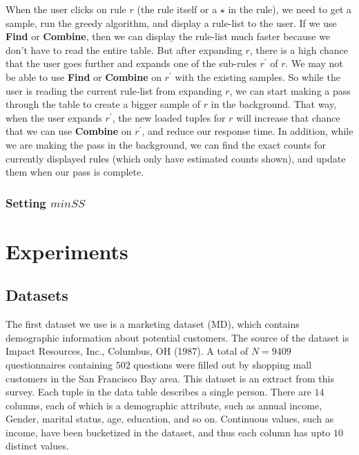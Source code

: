 \documentclass{sig-alternate}
\begin{document}
When the user clicks on rule $r$ (the rule itself or a $\star$ in the rule), we need to get a sample, run the greedy algorithm, and display a rule-list to the user. If we use \textbf{Find} or \textbf{Combine}, then we can display the rule-list much faster because we don't have to read the entire table. But after expanding $r$, there is a high chance that the user goes further and expands one of the sub-rules $r^{\prime}$ of $r$. We may not be able to use \textbf{Find} or \textbf{Combine} on $r^{\prime}$ with the existing samples. So while the user is reading the current rule-list from expanding $r$, we can start making a pass through the table to create a bigger sample of $r$ in the background. That way, when the user expands $r^{\prime}$, the new loaded tuples for $r$ will increase that chance that we can use \textbf{Combine} on $r^{\prime}$, and reduce our response time. 
In addition, while we are making the pass in the background, we can find the exact counts for currently displayed rules (which only have estimated counts shown), and update them when our pass is complete.


\subsubsection{Setting $minSS$}



\section{Experiments}
\subsection{Datasets}
The first dataset we use is a marketing dataset (MD), which contains demographic information about potential customers. The source of the dataset is Impact Resources, Inc., Columbus, OH (1987). A total of $N=9409$ questionnaires containing $502$ questions were 
filled out by shopping mall customers in the San Francisco Bay area. This dataset is an extract from this survey. Each tuple in the data table describes a single person. There are $14$ columns, each of which is a demographic attribute, such as annual income, Gender, marital status, age, education, and so on. Continuous values, such as income, have been bucketized in the dataset, and thus each column has upto $10$ distinct values. 
\end{document}
